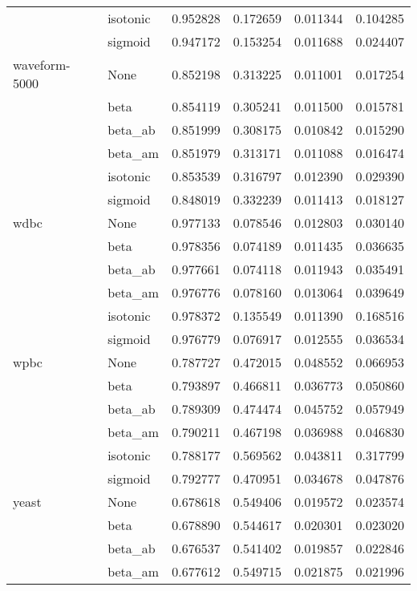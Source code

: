 \begin{tabular}{llrrrr}
        & isotonic &  0.952828 &  0.172659 &  0.011344 &  0.104285 \\
        & sigmoid &  0.947172 &  0.153254 &  0.011688 &  0.024407 \\
waveform-5000 & None &  0.852198 &  0.313225 &  0.011001 &  0.017254 \\
        & beta &  0.854119 &  0.305241 &  0.011500 &  0.015781 \\
        & beta\_ab &  0.851999 &  0.308175 &  0.010842 &  0.015290 \\
        & beta\_am &  0.851979 &  0.313171 &  0.011088 &  0.016474 \\
        & isotonic &  0.853539 &  0.316797 &  0.012390 &  0.029390 \\
        & sigmoid &  0.848019 &  0.332239 &  0.011413 &  0.018127 \\
wdbc & None &  0.977133 &  0.078546 &  0.012803 &  0.030140 \\
        & beta &  0.978356 &  0.074189 &  0.011435 &  0.036635 \\
        & beta\_ab &  0.977661 &  0.074118 &  0.011943 &  0.035491 \\
        & beta\_am &  0.976776 &  0.078160 &  0.013064 &  0.039649 \\
        & isotonic &  0.978372 &  0.135549 &  0.011390 &  0.168516 \\
        & sigmoid &  0.976779 &  0.076917 &  0.012555 &  0.036534 \\
wpbc & None &  0.787727 &  0.472015 &  0.048552 &  0.066953 \\
        & beta &  0.793897 &  0.466811 &  0.036773 &  0.050860 \\
        & beta\_ab &  0.789309 &  0.474474 &  0.045752 &  0.057949 \\
        & beta\_am &  0.790211 &  0.467198 &  0.036988 &  0.046830 \\
        & isotonic &  0.788177 &  0.569562 &  0.043811 &  0.317799 \\
        & sigmoid &  0.792777 &  0.470951 &  0.034678 &  0.047876 \\
yeast & None &  0.678618 &  0.549406 &  0.019572 &  0.023574 \\
        & beta &  0.678890 &  0.544617 &  0.020301 &  0.023020 \\
        & beta\_ab &  0.676537 &  0.541402 &  0.019857 &  0.022846 \\
        & beta\_am &  0.677612 &  0.549715 &  0.021875 &  0.021996 \\

\end{tabular}
